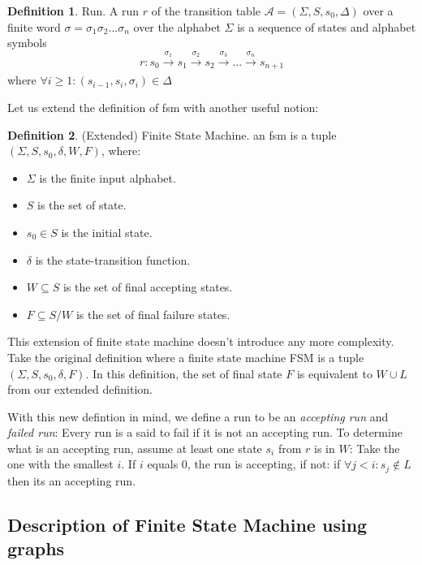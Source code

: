 \documentclass[12pt]{article}
\theoremstyle{definition}
\newtheorem{definition}{Definition}[section]
\theoremstyle{definition}
\theoremstyle{remark}
\newcommand{\A}{\mathcal{A}}
\begin{document}
\theoremstyle{definition}
\begin{definition}{Run.} A run $r$ of the transition table $\A = (\Sigma, S, s_{0}, \Delta)$ over a finite word $\sigma = \sigma_1 \sigma_2 ... \sigma_n$ over the alphabet $\Sigma$ is a sequence of states and alphabet symbols
$$r: s_0 \xrightarrow[]{\sigma_1} s_1 \xrightarrow[]{\sigma_2} s_2 \xrightarrow[]{\sigma_3} ... \xrightarrow[]{\sigma_n} s_{n+1}$$ where $\forall i \ge 1: (s_{i-1}, s_i, \sigma_i) \in \Delta$
\end{definition}

Let us extend the definition of \gls{fsm} with another useful notion:
\theoremstyle{definition}
\begin{definition}{(Extended) Finite State Machine.} an \gls{fsm} is a tuple $(\Sigma, S, s_{0},\delta, W, F)$, where:
\begin{itemize}
\item $\Sigma$ is the finite input alphabet.
\item $S$ is the set of state.
\item $s_{0} \in S$ is the initial state.
\item $\delta$ is the state-transition function.
\item $W \subseteq S$ is the set of final accepting states.
\item $F \subseteq S / W$ is the set of final failure states.
\end{itemize}
\end{definition}

This extension of finite state machine doesn't introduce any more complexity. Take the original definition where a finite state machine FSM is a tuple $(\Sigma, S, s_{0},\delta, F)$. In this definition, the set of final state $F$ is equivalent to $W \cup L$ from our extended definition.

With this new defintion in mind, we define a run to be an \textit{accepting run} and \textit{failed run}: Every run is a said to fail if it is not an accepting run. To determine what is an accepting run, assume at least one state $s_i$ from $r$ is in $W$: Take the one with the smallest $i$. If $i$ equals $0$, the run is accepting, if not: if $\forall j < i: s_j \notin L$ then its an accepting run.


\subsection{Description of Finite State Machine using graphs}
\end{document}
